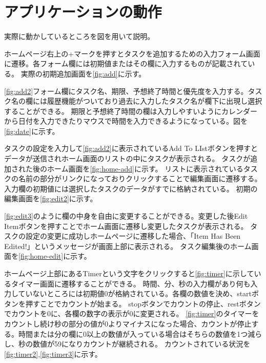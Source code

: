 \chapter{アプリケーションの動作}
\label{cha:motion}

実際に動かしているところを図を用いて説明。

ホームページ右上の+マークを押すとタスクを追加するための入力フォーム画面に遷移。各フォーム欄には初期値またはその欄に入力するものが記載されている。
実際の初期追加画面を\ref{fig:add}に示す。

\newpage

\ref{fig:add2}フォーム欄にタスク名、期限、予想終了時間と優先度を入力する。タスク名の欄には履歴機能がついており過去に入力したタスク名が欄下に出現し選択することができる。
期限と予想終了時間の欄は入力しやすいようにカレンダーから日付を入力できたりマウスで時間を入力できるようになっている。図を\ref{fig:date}に示す。

\newpage


\newpage
タスクの設定を入力して\ref{fig:add2}に表示されているAdd To LIstボタンを押すとデータが送信されホーム画面のリストの中にタスクが表示される。
タスクが追加された後のホーム画面を\ref{fig:home-add}に示す。
リストに表示されているタスクの名前の部分がリンクになっておりクリックすることで編集画面に遷移する。
入力欄の初期値には選択したタスクのデータがすでに格納されている。
初期の編集画面を\ref{fig:edit2}に示す。
\newpage


\newpage
\ref{fig:edit3}のように欄の中身を自由に変更することができる。変更した後Edit Itemボタンを押すことでホーム画面に遷移し変更したタスクが表示される。
タスクの設定の変更に成功しホームページに遷移した場合、「Item Has Been Edited!」というメッセージが画面上部に表示される。
タスク編集後のホーム画面を\ref{fig:home-edit}に示す。
\newpage


\newpage
ホームページ上部にあるTimerという文字をクリックすると\ref{fig:timer}に示しているタイマー画面に遷移することができる。
時間、分、秒の入力欄があり何も入力していないところには初期値0が格納されている。各欄の数値を決め、startボタンを押すことでカウントが始まる。
stopボタンでカウントの停止、restボタンでカウントを0に、各欄の数字の表示が0に変更される。
\newpage
{}
\ref{fig:timer}のタイマーをカウントし続け秒の部分の値が0よりマイナスになった場合、カウントが停止する。時間または分の欄に0以上の数値が入っている場合はそちらの数値を1つ減らし、秒の数値が59になりカウントが継続される。
カウントされている状況を\ref{fig:timer2},\ref{fig:timer3}に示す。